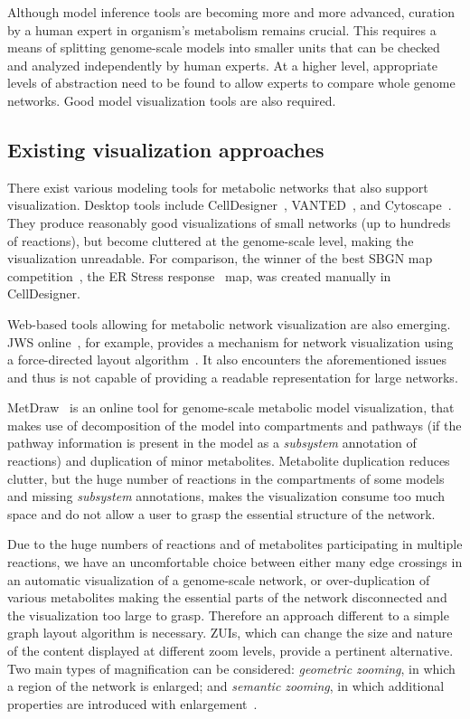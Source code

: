 \documentclass{bmcart}
\begin{document}
Although model inference tools are becoming more and more advanced, curation by a human expert in organism's metabolism remains crucial. This requires a means of splitting genome-scale models into smaller units that can be checked and analyzed independently by human experts. At a higher level, appropriate levels of abstraction need to be found to allow experts to compare whole genome networks. Good model visualization tools are also required.

\subsection*{Existing visualization approaches}
There exist various modeling tools for metabolic networks that also support visualization. Desktop tools include CellDesigner~\cite{Funahashi2008}, VANTED~\cite{Rohn2012}, and Cytoscape~\cite{Smoot2011}. They produce reasonably good visualizations of small networks (up to hundreds of reactions), but become cluttered at the genome-scale level, making the visualization unreadable. For comparison, the winner of the best SBGN map competition~\cite{SBGN}, the ER Stress response~\cite{Groenendyk2010} map,  was created manually in CellDesigner.

Web-based tools allowing for metabolic network visualization are also emerging.  JWS online~\cite{Snoep2003}, for example, provides a mechanism for network visualization using a force-directed layout algorithm~\cite{Fruchterman1991, Tamassia:2007:HGD:1202383}. It also encounters the aforementioned issues and thus is not capable of providing a readable representation for large networks.  

MetDraw~\cite{Jensen2014} is an online tool for genome-scale metabolic model visualization, that makes use of decomposition of the model into compartments and pathways (if the pathway information is present in the model as a \emph{subsystem} annotation of reactions) and duplication of minor metabolites. Metabolite duplication reduces clutter, but the huge number of reactions in the compartments of some models and missing \emph{subsystem} annotations, makes the visualization consume too much space and do not allow a user to grasp the essential structure of the network.

Due to the huge numbers of reactions and of metabolites participating in multiple reactions, we have an uncomfortable choice between either many edge crossings in an automatic visualization of a genome-scale network, or over-duplication of various metabolites making the essential parts of the network disconnected and the visualization too large to grasp. Therefore an approach different to a simple graph layout algorithm is necessary. ZUIs, which can change the size and nature of the content displayed at different zoom levels, provide a pertinent alternative. Two main types of magnification can be considered: \emph{geometric zooming}, in which a region of the network is enlarged; and \emph{semantic zooming}, in which additional properties are introduced with enlargement~\cite{Hu2007}.
\end{document}
